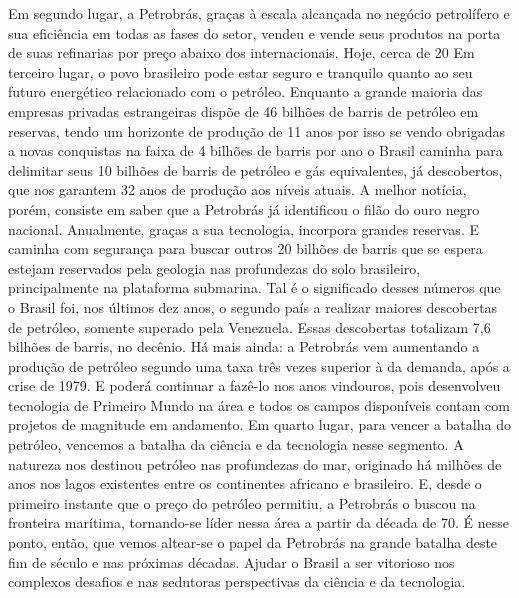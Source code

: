 Em segundo lugar, a Petrobrás, graças à escala alcançada no negócio petrolífero e sua eficiência em todas as fases do setor, vendeu e vende seus produtos na porta de suas refinarias por preço abaixo dos internacionais. Hoje, cerca de 20%
Em terceiro lugar, o povo brasileiro pode estar seguro e tranquilo quanto ao seu futuro energético relacionado com o petróleo. Enquanto a grande maioria das empresas privadas estrangeiras dispõe de 46 bilhões de barris de petróleo em reservas, tendo um horizonte de produção de 11 anos por isso se vendo obrigadas a novas conquistas na faixa de 4 bilhões de barris por ano o Brasil caminha para delimitar seus 10 bilhões de barris de petróleo e gás equivalentes, já descobertos, que nos garantem 32 anos de produção aos níveis atuais.
A melhor notícia, porém, consiste em saber que a Petrobrás já identificou o filão do ouro negro nacional. Anualmente, graças a sua tecnologia, incorpora grandes reservas. E caminha com segurança para buscar outros 20 bilhões de barris que se espera estejam reservados pela geologia nas profundezas do solo brasileiro, principalmente na plataforma submarina.
Tal é o significado desses números que o Brasil foi, nos últimos dez anos, o segundo país a realizar maiores descobertas de petróleo, somente superado pela Venezuela. Essas descobertas totalizam 7,6 bilhões de barris, no decênio.
Há mais ainda: a Petrobrás vem aumentando a produção de petróleo segundo uma taxa três vezes superior à da demanda, após a crise de 1979. E poderá continuar a fazê-lo nos anos vindouros, pois desenvolveu tecnologia de Primeiro Mundo na área e todos os campos disponíveis contam com projetos de magnitude em andamento.
Em quarto lugar, para vencer a batalha do petróleo, vencemos a batalha da ciência e da tecnologia nesse segmento. A natureza nos destinou petróleo nas profundezas do mar, originado há milhões de anos nos lagos existentes entre os continentes africano e brasileiro. E, desde o primeiro instante que o preço do petróleo permitiu, a Petrobrás o buscou na fronteira marítima, tornando-se líder nessa área a partir da década de 70.
É nesse ponto, então, que vemos altear-se o papel da Petrobrás na grande batalha deste fim de século e nas próximas décadas. Ajudar o Brasil a ser vitorioso nos complexos desafios e nas sedutoras perspectivas da ciência e da tecnologia.
